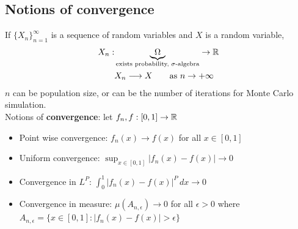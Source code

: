\subsection{Notions of convergence}
If $\{X_n\}_{n=1}^{\infty}$ is a sequence of random variables and $X$ is a random variable,
\begin{equation*}
    \begin{split}
        X_n : &\underbrace{\Omega}_{\text{exists probability, $\sigma$-algebra}}\to\mathbb{R}\\
        &X_n\longrightarrow X \qquad \text{as } n\rightarrow +\infty
    \end{split}     
\end{equation*}
$n$ can be population size, or can be the number of iterations for Monte Carlo simulation.\\

Notions of \textbf{convergence}: let $f_n, f : [0,1]\to\mathbb{R}$
    \begin{itemize}
        \item Point wise convergence: $f_n(x)\to f(x)$ for all $x\in[0,1]$
        \item Uniform convergence: $\displaystyle\sup_{x\in[0,1]}|f_n(x)-f(x)|\to 0$
        \item Convergence in $L^P$: $\displaystyle\int_{0}^{1}|f_n(x)-f(x)|^P\, dx\to 0$
        \item Convergence in measure: $\mu(A_{n,\epsilon})\to 0$ for all $\epsilon>0$ where $A_{n,\epsilon}=\{x\in[0,1] : |f_n(x)-f(x)|>\epsilon\}$
    \end{itemize}


